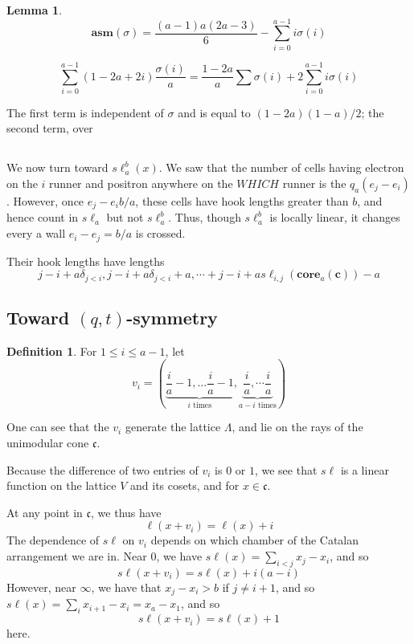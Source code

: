\documentclass{amsart}[12pt]
\theoremstyle{definition}
\newtheorem{lemma}[dummy]{Lemma}
\newtheorem{definition}[dummy]{Definition}
\newcommand{\core}{\mathbf{core}}
\newcommand{\sk}{s\ell}
\newcommand{\asm}{\mathbf{asm}}
\newcommand{\cone}{\mathfrak{c}}
\begin{document}
\begin{lemma}
$$\asm(\sigma)=\frac{(a-1)a(2a-3)}{6}-\sum_{i=0}^{a-1}i\sigma(i)$$




$$\sum_{i=0}^{a-1} (1-2a+2i)\frac{\sigma(i)}{a}=\frac{1-2a}{a}\sum\sigma(i)+2\sum_{i=0}^{a-1}i\sigma(i)$$

The first term is independent of $\sigma$ and is equal to $(1-2a)(1-a)/2$; the second term, over


\end{lemma}



\subsection{}
We now turn toward $\sk_a^b(x)$.  We saw that the number of cells
having electron on the $i$ runner and positron anywhere on the $WHICH$
runner is the $q_a(e_j-e_i)$.  However, once $e_j-e_ib/a$, these cells have hook lengths greater than $b$, and hence count in
$\sk_a$ but not $\sk_a^b$.  Thus, though $\sk_a^b$ is locally linear, it changes every a wall $e_i-e_j=b/a$ is crossed.




Their hook lengths have lengths $$j-i+a\delta_{j<i}, j-i+a\delta_{j<i}+a,\cdots+j-i+a\sk_{i,j}(\core_a(\mathbf{c}))-a$$

\subsection{Toward \texorpdfstring{$(q,t)$}{(q,t)}-symmetry}



\begin{definition}

For $1\leq i\leq a-1$, let $$v_i=\left(\underbrace{\frac{i}{a}-1,\dots \frac{i}{a}-1}_{i \text{ times}},\underbrace{ \frac{i}{a},\dotsm\frac{i}{a}}_{a-i \text{ times}}\right)$$
\end{definition}




One can see that the $v_i$ generate the lattice $\Lambda$, and lie on the rays of the unimodular cone $\cone$.  

Because the difference of two entries of $v_i$ is $0$ or $1$, we see that $\sk$ is a linear function on the lattice $V$ and its cosets, and for $x\in\cone$.

At any point in $\cone$, we thus have
$$\ell(x+v_i)=\ell(x)+i$$
The dependence of $\sk$ on $v_i$ depends on which chamber of the Catalan arrangement we are in.  Near $0$, we have $\sk(x)=\sum_{i<j} x_j-x_i$, and so
$$\sk(x+v_i) = \sk(x)+i(a-i)$$
However, near $\infty$, we have that $x_j-x_i>b$ if $j\neq i+1$, and so $\sk(x)=\sum_i x_{i+1}-x_i=x_a-x_1$, and so
$$\sk(x+v_i)=\sk(x)+1$$
here.
\end{document}
